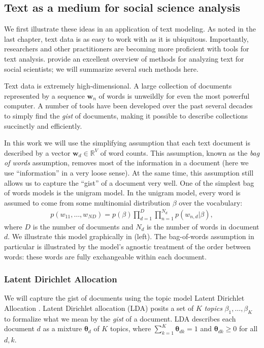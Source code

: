 \subsection{Text as a medium for social science analysis}
  \label{sec:text_intro}
  We first illustrate these ideas in an application of text modeling.
  As noted in the last chapter, text data is as easy to work with as
  it is ubiquitous. Importantly, researchers and other practitioners
  are becoming more proficient with tools for text analysis.
  \cite{grimmer:submitted} provide an excellent overview of methods
  for analyzing text for social scientists; we will summarize several
  such methods here.

  
  Text data is extremely high-dimensional.  A large collection of
  documents represented by a sequence $\bm w_n$ of words is unweildly
  for even the most powerful computer.  A number of tools have been
  developed over the past several decades to simply find the
  \emph{gist} of documents, making it possible to describe collections
  succinctly and efficiently.

  In this work we will use the simplifying assumption that each text
  document is described by a vector $\bm w_d \in \mathbb{R}^V$ of
  word counts.  This assumption, known as the \emph{bag of words}
  assumption, removes most of the information in a document (here we
  use ``information'' in a very loose sense).  At the same time, this
  assumption still allows us to capture the ``gist'' of a document
  very well. One of the simplest bag of words models is the unigram
  model. In the unigram model, every word is assumed to come from
  some multinomial distribution $\beta$ over the vocabulary:
  \begin{align*}
    p(w_{11}, \ldots, w_{ND}) = p(\beta) \prod_{d=1}^D \prod_{n=1}^{N_d} p(w_{n,d} |
  \beta),
\end{align*}
  where $D$ is the number of documents and $N_d$ is the number of
  words in document $d$.
  We illustrate this model graphically in
   (left).  The bag-of-words assumption in
  particular is illustrated by the model's agnostic treatment of the
  order between words: these words are fully exchangeable within each
  document.

\subsubsection{Latent Dirichlet Allocation}
We will capture the gist of documents using the topic model Latent
Dirichlet Allocation \citep{blei:2003}.  Latent Dirichlet allocation
(LDA) posits a set of $K$ \emph{topics} $\beta_1, \ldots, \beta_K$ to
formalize what we mean by the \emph{gist} of a document.  LDA
describes each document $d$ as a mixture $\bm \theta_d$ of $K$ topics,
where $\sum_{k=1}^K \bm \theta_{dk} = 1$ and $\bm \theta_{dk} \ge 0$ 
for all $d,k$.

